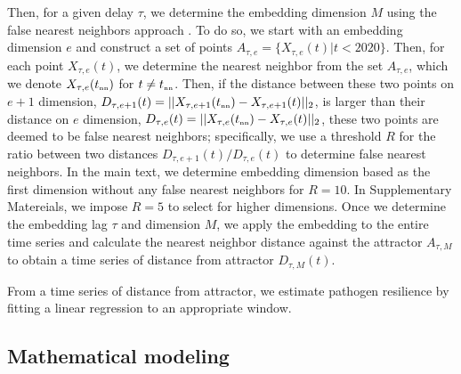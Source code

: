 \documentclass[12pt]{article}
\newcommand{\tsub}[2]{#1_{{\textrm{\tiny #2}}}}
\begin{document}
Then, for a given delay $\tau$, we determine the embedding dimension $M$ using the false nearest neighbors approach \citep{kennel1992determining,tan2023selecting}.
To do so, we start with an embedding dimension $e$ and construct a set of points $A_{\tau,e}= \{X_{\tau,e}(t) | t < 2020\}$.
Then, for each point $X_{\tau,e}(t)$, we determine the nearest neighbor from the set $A_{\tau,e}$, which we denote $X_{\tau,e}(\tsub{t}{nn})$ for $t \neq \tsub{t}{nn}$.
Then, if the distance between these two points on $e+1$ dimension, $D_{\tau,e+1}(t) = ||X_{\tau,e+1}(\tsub{t}{nn})-X_{\tau,e+1}(t)||_2$, is larger than their distance on $e$ dimension, $D_{\tau,e}(t) = ||X_{\tau,e}(\tsub{t}{nn})-X_{\tau,e}(t)||_2$, these two points are deemed to be false nearest neighbors;
specifically, we use a threshold $R$ for the ratio between two distances $D_{\tau,e+1}(t)/D_{\tau,e}(t)$ to determine false nearest neighbors.
In the main text, we determine embedding dimension based as the first dimension without any false nearest neighbors for $R=10$.
In Supplementary Matereials, we impose $R=5$ to select for higher dimensions.
Once we determine the embedding lag $\tau$ and dimension $M$, we apply the embedding to the entire time series and calculate the nearest neighbor distance against the attractor $A_{\tau,M}$ to obtain a time series of distance from attractor $D_{\tau,M}(t)$.

From a time series of distance from attractor, we estimate pathogen resilience by fitting a linear regression to an appropriate window.


\subsection*{Mathematical modeling}
\end{document}
